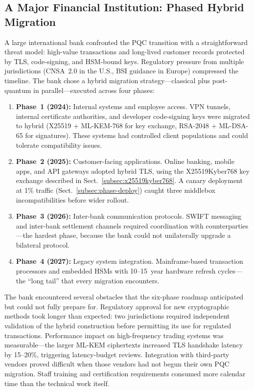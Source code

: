 \subsection{A Major Financial Institution: Phased Hybrid Migration}
\label{subsec:case-finance}

A large international bank confronted the PQC transition with a straightforward threat model: high-value transactions and long-lived customer records protected by TLS, code-signing, and HSM-bound keys.  Regulatory pressure from multiple jurisdictions (CNSA~2.0 in the U.S., BSI guidance in Europe) compressed the timeline.  The bank chose a hybrid migration strategy---classical plus post-quantum in parallel---executed across four phases:

\begin{enumerate}
\item \textbf{Phase~1 (2024):} Internal systems and employee access.  VPN tunnels, internal certificate authorities, and developer code-signing keys were migrated to hybrid (X25519 + ML-KEM-768 for key exchange, RSA-2048 + ML-DSA-65 for signatures).  These systems had controlled client populations and could tolerate compatibility issues.
\item \textbf{Phase~2 (2025):} Customer-facing applications.  Online banking, mobile apps, and API gateways adopted hybrid TLS, using the X25519Kyber768 key exchange described in Sect.~\ref{subsec:x25519kyber768}.  A canary deployment at 1\% traffic (Sect.~\ref{subsec:phase-deploy}) caught three middlebox incompatibilities before wider rollout.
\item \textbf{Phase~3 (2026):} Inter-bank communication protocols.  SWIFT messaging and inter-bank settlement channels required coordination with counterparties---the hardest phase, because the bank could not unilaterally upgrade a bilateral protocol.
\item \textbf{Phase~4 (2027):} Legacy system integration.  Mainframe-based transaction processors and embedded HSMs with 10--15~year hardware refresh cycles---the ``long tail'' that every migration encounters.
\end{enumerate}

The bank encountered several obstacles that the six-phase roadmap anticipated but could not fully prepare for.  Regulatory approval for new cryptographic methods took longer than expected: two jurisdictions required independent validation of the hybrid construction before permitting its use for regulated transactions.  Performance impact on high-frequency trading systems was measurable---the larger ML-KEM ciphertexts increased TLS handshake latency by 15--20\%, triggering latency-budget reviews.  Integration with third-party vendors proved difficult when those vendors had not begun their own PQC migration.  Staff training and certification requirements consumed more calendar time than the technical work itself.

